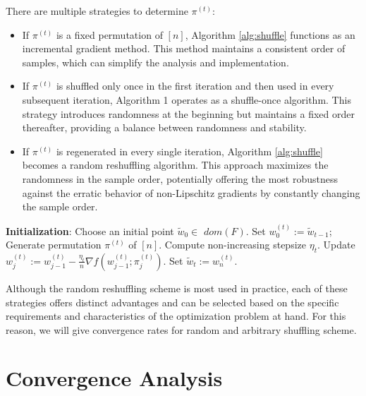 \documentclass{article} %
\theoremstyle{plain}
\theoremstyle{definition}
\theoremstyle{remark}
\begin{document}
There are multiple strategies to determine $\pi^{(t)}$:
\begin{itemize}
    \item If $\pi^{(t)}$ is a fixed permutation of $[n]$, Algorithm \ref{alg:shuffle} functions as an incremental gradient method. This method maintains a consistent order of samples, which can simplify the analysis and implementation.
    \item If $\pi^{(t)}$ is shuffled only once in the first iteration and then used in every subsequent iteration, Algorithm 1 operates as a shuffle-once algorithm. This strategy introduces randomness at the beginning but maintains a fixed order thereafter, providing a balance between randomness and stability.
    \item If $\pi^{(t)}$ is regenerated in every single iteration, Algorithm \ref{alg:shuffle} becomes a random reshuffling algorithm. This approach maximizes the randomness in the sample order, potentially offering the most robustness against the erratic behavior of non-Lipschitz gradients by constantly changing the sample order.
\end{itemize}

\begin{algorithm}[t]
\caption{Shuffling-type Gradient Algorithm}\label{alg:shuffle}
\label{alg}
\begin{algorithmic} %
\STATE \textbf{Initialization}: Choose an initial point $\tilde{w}_0\in$ $dom (F)$.
    \STATE Set $w^{(t)}_0:=\tilde{w}_{t-1}$;
    \STATE Generate permutation $\pi^{(t)}$ of $[n]$.
    \STATE Compute non-increasing stepsize $\eta_t$.
        \STATE Update $w^{(t)}_j:=w^{(t)}_{j-1}-\frac{\eta_t}{n}\nabla f(w^{(t)}_{j-1};\pi^{(t)}_j).$
    \ENDFOR
    \STATE Set $\tilde{w}_t:=w^{(t)}_n.$
\ENDFOR 
\end{algorithmic}
\end{algorithm}

Although the random reshuffling scheme is most used in practice, each of these strategies offers distinct advantages and can be selected based on the specific requirements and characteristics of the optimization problem at hand. For this reason, we will give convergence rates for random and arbitrary shuffling scheme.

\section{Convergence Analysis}
\label{section:main}
\end{document}
